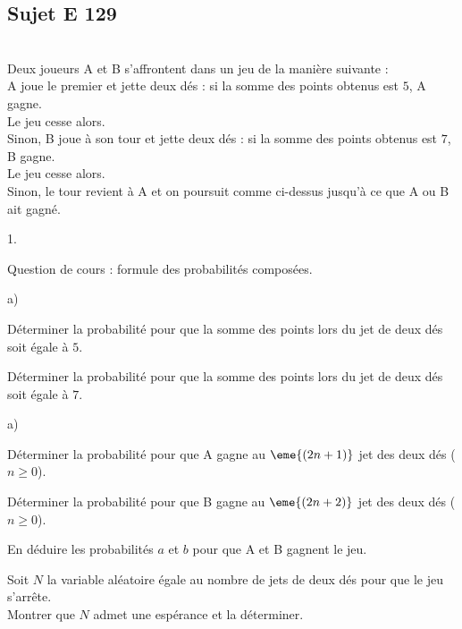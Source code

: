 \documentclass[11pt]{article}%
\begin{document}
\subsection*{Sujet E 129}

\begin{exerciceAP}~\\
  Deux joueurs A et B s'affrontent dans un jeu de la manière suivante
  :\\
  A joue le premier et jette deux dés : si la somme des points obtenus
  est $5$, A gagne.\\
  Le jeu cesse alors.\\
  Sinon, B joue à son tour et jette deux dés : si la somme des points
  obtenus est $7$, B gagne.\\
  Le jeu cesse alors.\\
  Sinon, le tour revient à A et on poursuit comme ci-dessus jusqu'à ce
  que A ou B ait gagné.
  \begin{noliste}{1.}
    \setlength{\itemsep}{2mm}
  \item Question de cours : formule des probabilités composées.
    
  \item
    \begin{noliste}{a)}
      \setlength{\itemsep}{2mm}
    \item Déterminer la probabilité pour que la somme des points lors
      du jet de deux dés soit égale à $5$.
      
    \item Déterminer la probabilité pour que la somme des points lors
      du jet de deux dés soit égale à $7$.
    \end{noliste}
    
  \item
    \begin{noliste}{a)}
      \setlength{\itemsep}{2mm}
    \item Déterminer la probabilité pour que A gagne au $\eme{(2n+1)}$
      jet des deux dés ($n \geq 0$).
      
    \item Déterminer la probabilité pour que B gagne au $\eme{(2n+2)}$
      jet des deux dés ($n \geq 0$).
    \end{noliste}
    
  \item En déduire les probabilités $a$ et $b$ pour que A et B gagnent
    le jeu.
    
  \item Soit $N$ la variable aléatoire égale au nombre de jets de deux
    dés pour que le jeu s'arrête.\\
    Montrer que $N$ admet une espérance et la déterminer.
  \end{noliste}
\end{exerciceAP}
\end{document}
